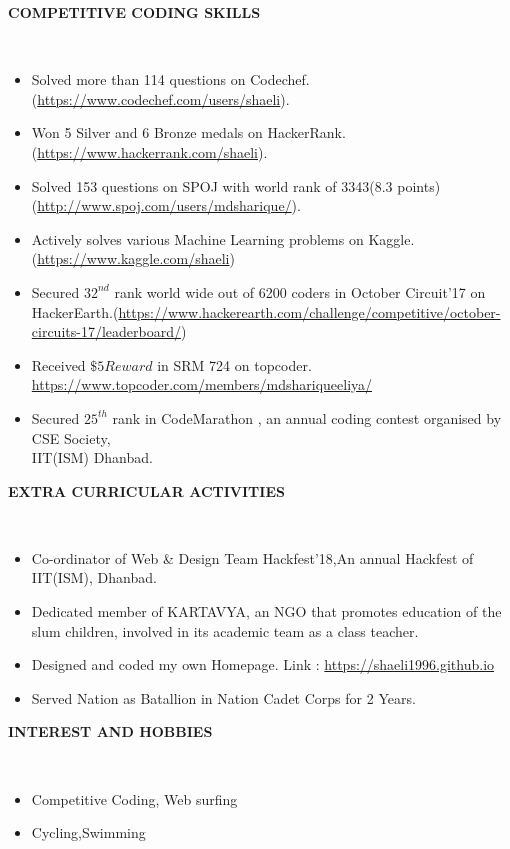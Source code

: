 \documentclass[a4paper,10pt]{article}
\newcommand{\lsep}{-0.5cm}
\newcommand{\resheading}[1]{{\small \colorbox{mygrey}{\begin{minipage}{0.975\textwidth}{\textbf{#1 \vphantom{p\^{E}}}}\end{minipage}}}}
\begin{document}
\resheading{\textbf{COMPETITIVE CODING SKILLS} }\\[\lsep]
\begin{itemize}
\item \noindent Solved more than 114 questions on Codechef. (\url{https://www.codechef.com/users/shaeli}).
\item \noindent Won 5 Silver and 6 Bronze medals on HackerRank.(\url{https://www.hackerrank.com/shaeli}).
\item \noindent Solved 153 questions on SPOJ with world rank of 3343(8.3 points) (\url{http://www.spoj.com/users/mdsharique/}).
\item \noindent Actively solves various Machine Learning problems on Kaggle.(\url{https://www.kaggle.com/shaeli})
\item \noindent Secured $32^{nd}$ rank world wide out of 6200 coders in October Circuit'17 on HackerEarth.(\url{https://www.hackerearth.com/challenge/competitive/october-circuits-17/leaderboard/})
\item \noindent Received $\$5 Reward$ in SRM 724 on topcoder. \url{https://www.topcoder.com/members/mdshariqueeliya/}
\item \noindent Secured  $25^{th}$ rank in CodeMarathon , an annual coding contest organised by CSE Society,\\
IIT(ISM) Dhanbad.
\end{itemize}

\resheading{\textbf{EXTRA CURRICULAR ACTIVITIES} }\\[\lsep]
\begin{itemize}
\item \noindent Co-ordinator of Web \& Design Team Hackfest'18,An annual Hackfest of IIT(ISM), Dhanbad.
\item \noindent Dedicated member of KARTAVYA, an NGO that promotes education of the slum children, involved in its academic team as a class teacher.
\item \noindent Designed and coded my own Homepage. Link : \url{https://shaeli1996.github.io}
\item \noindent Served Nation as Batallion in Nation Cadet Corps for 2 Years.

\end{itemize}

\resheading{\textbf{INTEREST AND HOBBIES} }\\[\lsep]
\begin{itemize}
\item \noindent Competitive Coding, Web surfing
\item \noindent Cycling,Swimming

\end{itemize}
\end{document}
